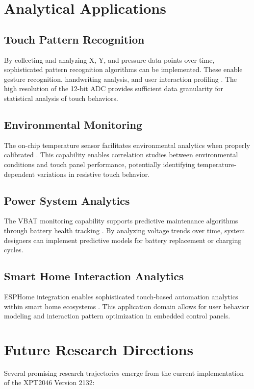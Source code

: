 \section{Analytical Applications}

\subsection{Touch Pattern Recognition}
By collecting and analyzing X, Y, and pressure data points over time, sophisticated pattern recognition algorithms can be implemented. These enable gesture recognition, handwriting analysis, and user interaction profiling \cite{ xpt2046:2007}. The high resolution of the 12-bit ADC provides sufficient data granularity for statistical analysis of touch behaviors.

\subsection{Environmental Monitoring}
The on-chip temperature sensor facilitates environmental analytics when properly calibrated \cite{ xpt2046:2007}. This capability enables correlation studies between environmental conditions and touch panel performance, potentially identifying temperature-dependent variations in resistive touch behavior.

\subsection{Power System Analytics}
The VBAT monitoring capability supports predictive maintenance algorithms through battery health tracking \cite{ xpt2046:2007}. By analyzing voltage trends over time, system designers can implement predictive models for battery replacement or charging cycles.

\subsection{Smart Home Interaction Analytics}
ESPHome integration enables sophisticated touch-based automation analytics within smart home ecosystems \cite{ESPHome:2024}. This application domain allows for user behavior modeling and interaction pattern optimization in embedded control panels.

\section{Future Research Directions}
Several promising research trajectories emerge from the current implementation of the XPT2046 Version 2132:

